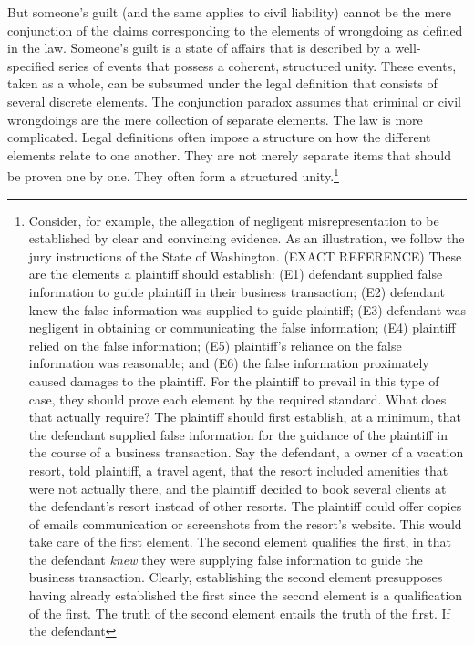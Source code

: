 \documentclass[
  10pt,
  dvipsnames,enabledeprecatedfontcommands]{scrartcl}
\begin{document}
But someone's guilt (and the same applies to civil liability) cannot be
the mere conjunction of the claims corresponding to the elements of
wrongdoing as defined in the law. Someone's guilt is a state of affairs
that is described by a well-specified series of events that possess a
coherent, structured unity. These events, taken as a whole, can be
subsumed under the legal definition that consists of several discrete
elements. The conjunction paradox assumes that criminal or civil
wrongdoings are the mere collection of separate elements. The law is
more complicated. Legal definitions often impose a structure on how the
different elements relate to one another. They are not merely separate
items that should be proven one by one. They often form a structured
unity.\footnote{Consider, for example, the allegation of negligent
  misrepresentation to be established by clear and convincing evidence.
  As an illustration, we follow the jury instructions of the State of
  Washington. (EXACT REFERENCE) These are the elements a plaintiff
  should establish: (E1) defendant supplied false information to guide
  plaintiff in their business transaction; (E2) defendant knew the false
  information was supplied to guide plaintiff; (E3) defendant was
  negligent in obtaining or communicating the false information; (E4)
  plaintiff relied on the false information; (E5) plaintiff's reliance
  on the false information was reasonable; and (E6) the false
  information proximately caused damages to the plaintiff. For the
  plaintiff to prevail in this type of case, they should prove each
  element by the required standard. What does that actually require? The
  plaintiff should first establish, at a minimum, that the defendant
  supplied false information for the guidance of the plaintiff in the
  course of a business transaction. Say the defendant, a owner of a
  vacation resort, told plaintiff, a travel agent, that the resort
  included amenities that were not actually there, and the plaintiff
  decided to book several clients at the defendant's resort instead of
  other resorts. The plaintiff could offer copies of emails
  communication or screenshots from the resort's website. This would
  take care of the first element. The second element qualifies the
  first, in that the defendant \emph{knew} they were supplying false
  information to guide the business transaction. Clearly, establishing
  the second element presupposes having already established the first
  since the second element is a qualification of the first. The truth of
  the second element entails the truth of the first. If the defendant
}
\end{document}
